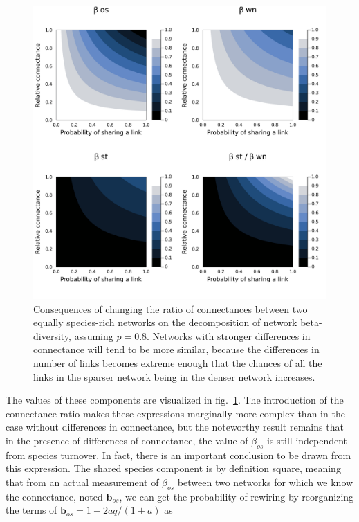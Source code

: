 \documentclass[10pt,oneside]{article}
\makeatletter
\def\maxwidth{\ifdim\Gin@nat@width>\linewidth\linewidth
\else\Gin@nat@width\fi}
\let\Oldincludegraphics\includegraphics
\renewcommand{\includegraphics}[1]{\Oldincludegraphics[width=\maxwidth]{#1}}
\makeatother
\begin{document}
\begin{figure}
\hypertarget{fig:connectance}{%
\centering
\includegraphics{figures/connectance/components.png}
\caption{Consequences of changing the ratio of connectances between two
equally species-rich networks on the decomposition of network
beta-diversity, assuming \(p = 0.8\). Networks with stronger differences
in connectance will tend to be more similar, because the differences in
number of links becomes extreme enough that the chances of all the links
in the sparser network being in the denser network
increases.}\label{fig:connectance}
}
\end{figure}

The values of these components are visualized in
fig.~\ref{fig:connectance}. The introduction of the connectance ratio
makes these expressions marginally more complex than in the case without
differences in connectance, but the noteworthy result remains that in
the presence of differences of connectance, the value of \(\beta_{os}\)
is still independent from species turnover. In fact, there is an
important conclusion to be drawn from this expression. The shared
species component is by definition square, meaning that from an actual
measurement of \(\beta_{os}\) between two networks for which we know the
connectance, noted \(\mathbf{b}_{os}\), we can get the probability of
rewiring by reorganizing the terms of
\(\mathbf{b}_{os} = 1 - 2aq/(1+a)\) as
\end{document}

